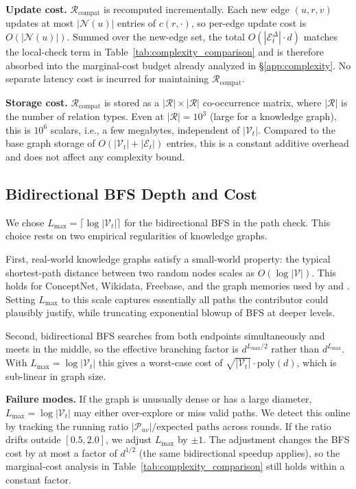 \textbf{Update cost.}
$\mathcal{R}_{\text{compat}}$ is recomputed incrementally. Each new
edge $(u, r, v)$ updates at most $|\mathcal{N}(u)|$ entries of $c(r,
\cdot)$, so per-edge update cost is $O(|\mathcal{N}(u)|)$. Summed
over the new-edge set, the total $O(|\mathcal{E}_t^\Delta| \cdot d)$
matches the local-check term in Table~\ref{tab:complexity_comparison}
and is therefore absorbed into the marginal-cost budget already
analyzed in \S\ref{app:complexity}. No separate latency cost is
incurred for maintaining $\mathcal{R}_{\text{compat}}$.

\textbf{Storage cost.}
$\mathcal{R}_{\text{compat}}$ is stored as a $|\mathcal{R}| \times
|\mathcal{R}|$ co-occurrence matrix, where $|\mathcal{R}|$ is the
number of relation types. Even at $|\mathcal{R}| = 10^3$ (large for a
knowledge graph), this is $10^6$ scalars, i.e., a few megabytes,
independent of $|\mathcal{V}_t|$. Compared to the base graph
storage of $O(|\mathcal{V}_t| + |\mathcal{E}_t|)$ entries, this is a
constant additive overhead and does not affect any complexity
bound.

\subsection{Bidirectional BFS Depth and Cost}
\label{app:graph_bfs}

We chose $L_{\max} = \lceil \log |\mathcal{V}_t| \rceil$ for the
bidirectional BFS in the path check. This choice rests on two
empirical regularities of knowledge graphs.

First, real-world knowledge graphs satisfy a small-world property:
the typical shortest-path distance between two random nodes scales
as $O(\log |\mathcal{V}|)$. This holds for ConceptNet, Wikidata,
Freebase, and the graph memories used by \cite{anokhin2024arigraph}
and \cite{zhang2025g}. Setting $L_{\max}$ to this scale captures
essentially all paths the contributor could plausibly justify, while
truncating exponential blowup of BFS at deeper levels.

Second, bidirectional BFS searches from both endpoints simultaneously
and meets in the middle, so the effective branching factor is
$d^{L_{\max}/2}$ rather than $d^{L_{\max}}$. With $L_{\max} = \log
|\mathcal{V}_t|$ this gives a worst-case cost of $\sqrt{|\mathcal{V}_t|}
\cdot \text{poly}(d)$, which is sub-linear in graph size.

\textbf{Failure modes.}
If the graph is unusually dense or has a large diameter, $L_{\max} =
\log |\mathcal{V}_t|$ may either over-explore or miss valid paths. We
detect this online by tracking the running ratio
$|\mathcal{P}_{uv}| / \text{expected paths}$ across rounds. If the
ratio drifts outside $[0.5, 2.0]$, we adjust $L_{\max}$ by $\pm 1$.
The adjustment changes the BFS cost by at most a factor of $d^{1/2}$
(the same bidirectional speedup applies), so the marginal-cost
analysis in Table~\ref{tab:complexity_comparison} still holds within
a constant factor.

